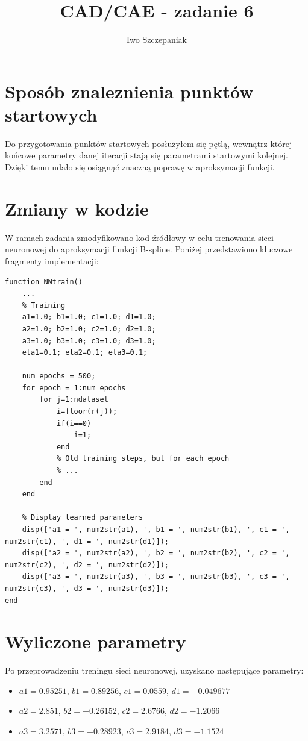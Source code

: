 \documentclass{article}
\title{CAD/CAE - zadanie 6}
\author{Iwo Szczepaniak}
\begin{document}
\maketitle

\section{Sposób znaleznienia punktów startowych}
Do przygotowania punktów startowych posłużyłem się pętlą, wewnątrz której końcowe parametry danej iteracji stają się parametrami startowymi kolejnej. Dzięki temu udało się osiągnąć znaczną poprawę w aproksymacji funkcji.

\section{Zmiany w kodzie}
W ramach zadania zmodyfikowano kod źródłowy w celu trenowania sieci neuronowej do aproksymacji funkcji B-spline. Poniżej przedstawiono kluczowe fragmenty implementacji:
\begin{verbatim}
function NNtrain()
    ...
    % Training
    a1=1.0; b1=1.0; c1=1.0; d1=1.0;
    a2=1.0; b2=1.0; c2=1.0; d2=1.0;
    a3=1.0; b3=1.0; c3=1.0; d3=1.0;
    eta1=0.1; eta2=0.1; eta3=0.1;
    
    num_epochs = 500;
    for epoch = 1:num_epochs
        for j=1:ndataset
            i=floor(r(j));
            if(i==0)
                i=1;
            end
            % Old training steps, but for each epoch
            % ...
        end
    end
    
    % Display learned parameters
    disp(['a1 = ', num2str(a1), ', b1 = ', num2str(b1), ', c1 = ', num2str(c1), ', d1 = ', num2str(d1)]);
    disp(['a2 = ', num2str(a2), ', b2 = ', num2str(b2), ', c2 = ', num2str(c2), ', d2 = ', num2str(d2)]);
    disp(['a3 = ', num2str(a3), ', b3 = ', num2str(b3), ', c3 = ', num2str(c3), ', d3 = ', num2str(d3)]);
end
\end{verbatim}

\section{Wyliczone parametry}
Po przeprowadzeniu treningu sieci neuronowej, uzyskano następujące parametry:
\begin{itemize}
    \item $a1 = 0.95251$, $b1 = 0.89256$, $c1 = 0.0559$, $d1 = -0.049677$
    \item $a2 = 2.851$, $b2 = -0.26152$, $c2 = 2.6766$, $d2 = -1.2066$
    \item $a3 = 3.2571$, $b3 = -0.28923$, $c3 = 2.9184$, $d3 = -1.1524$
\end{itemize}
\end{document}
